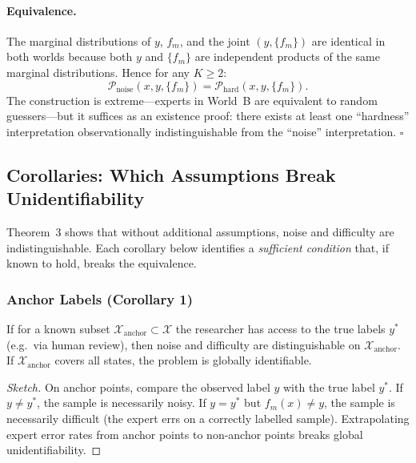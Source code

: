 \paragraph{Equivalence.}
The marginal distributions of $y$, $f_m$, and the joint
$(y,\{f_m\})$ are identical in both worlds because both $y$ and $\{f_m\}$
are independent products of the same marginal distributions.  Hence for any
$K\ge2$:
\[
\mathcal{P}_{\text{noise}}(x,y,\{f_m\})
= \mathcal{P}_{\text{hard}}(x,y,\{f_m\}).
\]
The construction is extreme---experts in World~B are equivalent to random
guessers---but it suffices as an existence proof: there exists at least one
``hardness'' interpretation observationally indistinguishable from the
``noise'' interpretation. \hfill$\square$

\subsection{Corollaries: Which Assumptions Break Unidentifiability}
\label{sec:thm3_corollaries}

Theorem~3 shows that without additional assumptions, noise and difficulty are
indistinguishable.  Each corollary below identifies a \emph{sufficient
condition} that, if known to hold, breaks the equivalence.

\subsubsection{Anchor Labels (Corollary 1)}
\label{sec:corollary1}

\begin{corollary}
  If for a known subset $\mathcal{X}_{\text{anchor}}\subset\mathcal{X}$ the
  researcher has access to the true labels $y^*$ (e.g.\ via human review),
  then noise and difficulty are distinguishable on
  $\mathcal{X}_{\text{anchor}}$.  If $\mathcal{X}_{\text{anchor}}$ covers all
  states, the problem is globally identifiable.
\end{corollary}

\begin{proof}[Sketch]
  On anchor points, compare the observed label $y$ with the true label $y^*$.
  If $y\neq y^*$, the sample is necessarily noisy.  If $y=y^*$ but
  $f_m(x)\neq y$, the sample is necessarily difficult (the expert errs on a
  correctly labelled sample).  Extrapolating expert error rates from anchor
  points to non-anchor points breaks global unidentifiability.
\end{proof}

